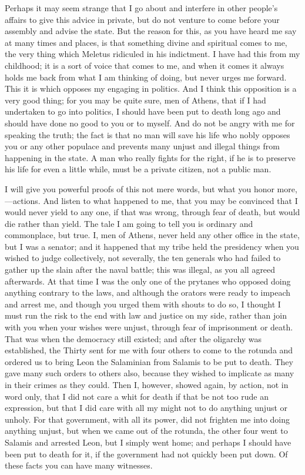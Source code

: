 \documentclass[letterpaper,12pt]{article}
\newcommand{\stephpag}[1]{\marginnote{\small\itshape\fontfamily{ppl}\selectfont #1}}
\begin{document}
Perhaps it may seem strange that I go about and interfere in other people's affairs to give this advice in private, but do not venture to come before your assembly and advise the state. But the reason for this, as you have heard me say \stephpag{d} at many times and places, is that something divine and spiritual comes to me, the very thing which Meletus ridiculed in his indictment. I have had this from my childhood; it is a sort of voice that comes to me, and when it comes it always holds me back from what I am thinking of doing, but never urges me forward. This it is which opposes my engaging in politics. And I think this opposition is a very good thing; for you may be quite sure, men of Athens, that if I had undertaken to go into politics, I should have been put to death long ago and should have done \stephpag{e} no good to you or to myself. And do not be angry with me for speaking the truth; the fact is that no man will save his life who nobly opposes you or any other populace and prevents many unjust and illegal things from happening in the state. \stephpag{32 a} A man who really fights for the right, if he is to preserve his life for even a little while, must be a private citizen, not a public man.

I will give you powerful proofs of this not mere words, but what you honor more,---actions. And listen to what happened to me, that you may be convinced that I would never yield to any one, if that was wrong, through fear of death, but would die rather than yield. The tale I am going to tell you is ordinary and commonplace, but true. \stephpag{b} I, men of Athens, never held any other office in the state, but I was a senator; and it happened that my tribe held the presidency when you wished to judge collectively, not severally, the ten generals who had failed to gather up the slain after the naval battle; this was illegal, as you all agreed afterwards. At that time I was the only one of the prytanes who opposed doing anything contrary to the laws, and although the orators were ready to impeach and arrest me, and though you urged them with shouts to do so, I thought \stephpag{c} I must run the risk to the end with law and justice on my side, rather than join with you when your wishes were unjust, through fear of imprisonment or death. That was when the democracy still existed; and after the oligarchy was established, the Thirty sent for me with four others to come to the rotunda and ordered us to bring Leon the Salaminian from Salamis to be put to death. They gave many such orders to others also, because they wished to implicate as many in their crimes as they could. Then I, however, \stephpag{d} showed again, by action, not in word only, that I did not care a whit for death if that be not too rude an expression, but that I did care with all my might not to do anything unjust or unholy. For that government, with all its power, did not frighten me into doing anything unjust, but when we came out of the rotunda, the other four went to Salamis and arrested Leon, but I simply went home; and perhaps I should have been put to death for it, if the government had not \stephpag{e} quickly been put down. Of these facts you can have many witnesses.
\end{document}
